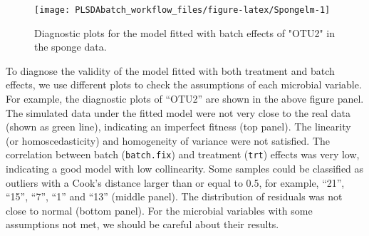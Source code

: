 \documentclass[
]{book}
\newenvironment{Shaded}{\begin{snugshade}}{\end{snugshade}}
\newcommand{\AttributeTok}[1]{\textcolor[rgb]{0.77,0.63,0.00}{#1}}
\newcommand{\ControlFlowTok}[1]{\textcolor[rgb]{0.13,0.29,0.53}{\textbf{#1}}}
\newcommand{\DecValTok}[1]{\textcolor[rgb]{0.00,0.00,0.81}{#1}}
\newcommand{\FunctionTok}[1]{\textcolor[rgb]{0.00,0.00,0.00}{#1}}
\newcommand{\NormalTok}[1]{#1}
\newcommand{\OtherTok}[1]{\textcolor[rgb]{0.56,0.35,0.01}{#1}}
\newcommand{\SpecialCharTok}[1]{\textcolor[rgb]{0.00,0.00,0.00}{#1}}
\newcommand{\StringTok}[1]{\textcolor[rgb]{0.31,0.60,0.02}{#1}}
\begin{document}
\begin{Shaded}
\end{Shaded}

\begin{figure}

{\centering \texttt{[image: PLSDAbatch\_workflow\_files/figure-latex/Spongelm-1]} 

}

\caption{Diagnostic plots for the model fitted with batch effects of "OTU2" in the sponge data.}\label{fig:Spongelm}
\end{figure}

To diagnose the validity of the model fitted with both treatment and batch effects, we use different plots to check the assumptions of each microbial variable. For example, the diagnostic plots of ``OTU2'' are shown in the above figure panel. The simulated data under the fitted model were not very close to the real data (shown as green line), indicating an imperfect fitness (top panel). The linearity (or homoscedasticity) and homogeneity of variance were not satisfied. The correlation between batch (\texttt{batch.fix}) and treatment (\texttt{trt}) effects was very low, indicating a good model with low collinearity. Some samples could be classified as outliers with a Cook's distance larger than or equal to 0.5, for example, ``21'', ``15'', ``7'', ``1'' and ``13'' (middle panel). The distribution of residuals was not close to normal (bottom panel). For the microbial variables with some assumptions not met, we should be careful about their results.
\end{document}
